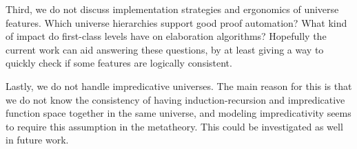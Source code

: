 \documentclass[a4paper,UKenglish,cleveref, autoref, thm-restate]{lipics-v2021}
\theoremstyle{remark}
\theoremstyle{definition}
\begin{document}
Third, we do not discuss implementation strategies and ergonomics of universe
features. Which universe hierarchies support good proof automation? What kind of
impact do first-class levels have on elaboration algorithms? Hopefully the
current work can aid answering these questions, by at least giving a way to quickly
check if some features are logically consistent.

Lastly, we do not handle impredicative universes. The main reason for this is
that we do not know the consistency of having induction-recursion and
impredicative function space together in the same universe, and modeling
impredicativity seems to require this assumption in the metatheory. This could
be investigated as well in future work.


\end{document}
